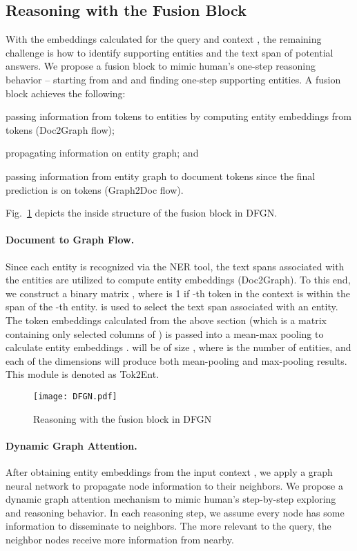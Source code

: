 \documentclass[11pt,a4paper]{article}
\newcommand{\method}{DFGN\xspace}
\begin{document}
\subsection{Reasoning with the Fusion Block}
With the embeddings calculated for the query  and context , 
the remaining challenge is how to identify supporting entities and the text span of potential answers. 
We propose a fusion block to mimic human's one-step reasoning behavior -- starting from  and  and finding one-step supporting entities. 
A fusion block achieves the following:
\begin{inparaenum}
    \item passing information from tokens to entities by computing entity embeddings from tokens (Doc2Graph flow);
    \item propagating information on entity graph; and
    \item passing information from entity graph to document tokens since the final prediction is on tokens (Graph2Doc flow). 
\end{inparaenum}
Fig.~\ref{fig:gnn} depicts the inside structure of the fusion block in \method.

\paragraph{Document to Graph Flow.}
Since each entity is recognized via the NER tool, the text spans associated with the entities are utilized to compute entity embeddings (Doc2Graph). 
To this end, we construct a binary matrix , where  is 1 if 
-th token in the context is within the span of the -th entity. 
 is used to select the text span associated with an entity. 
The token embeddings calculated from the above section (which is a matrix containing only selected columns of ) is passed into a mean-max pooling to calculate entity embeddings . 
 will be of size , where  is the number of entities, and each of the  dimensions will produce both mean-pooling and max-pooling results. 
This module is denoted as Tok2Ent.




\begin{figure}[tb]
\centering
\texttt{[image: DFGN.pdf]}
\caption{Reasoning with the fusion block in \method}
\label{fig:gnn}
\end{figure}

\paragraph{Dynamic Graph Attention.}
After obtaining entity embeddings from the input context , we apply a graph neural network to propagate node information to their neighbors. 
We propose a dynamic graph attention mechanism to mimic human's step-by-step exploring and reasoning behavior. 
In each reasoning step, we assume every node has some information to disseminate to neighbors. 
The more relevant to the query, the neighbor nodes receive more information from nearby. 
\end{document}

